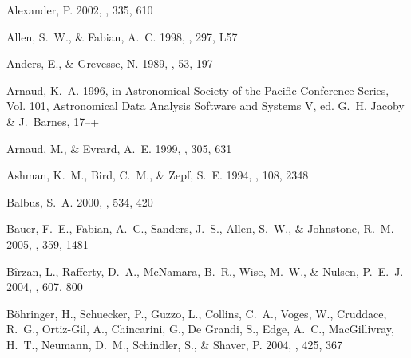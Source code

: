\documentclass[12pt,preprint]{aastex}
\begin{document}
\begin{thebibliography}{139}

{Alexander}, P. 2002, \mnras, 335, 610

{Allen}, S.~W., \& {Fabian}, A.~C. 1998, \mnras, 297, L57

{Anders}, E., \& {Grevesse}, N. 1989, \gca, 53, 197

{Arnaud}, K.~A. 1996, in Astronomical Society of the Pacific Conference Series,
  Vol. 101, Astronomical Data Analysis Software and Systems V, ed. G.~H.
  {Jacoby} \& J.~{Barnes}, 17--+

{Arnaud}, M., \& {Evrard}, A.~E. 1999, \mnras, 305, 631

{Ashman}, K.~M., {Bird}, C.~M., \& {Zepf}, S.~E. 1994, \aj, 108, 2348

{Balbus}, S.~A. 2000, \apj, 534, 420

{Bauer}, F.~E., {Fabian}, A.~C., {Sanders}, J.~S., {Allen}, S.~W., \&
  {Johnstone}, R.~M. 2005, \mnras, 359, 1481

{B{\^i}rzan}, L., {Rafferty}, D.~A., {McNamara}, B.~R., {Wise}, M.~W., \&
  {Nulsen}, P.~E.~J. 2004, \apj, 607, 800

{B{\"o}hringer}, H., {Schuecker}, P., {Guzzo}, L., {Collins}, C.~A., {Voges},
  W., {Cruddace}, R.~G., {Ortiz-Gil}, A., {Chincarini}, G., {De Grandi}, S.,
  {Edge}, A.~C., {MacGillivray}, H.~T., {Neumann}, D.~M., {Schindler}, S., \&
  {Shaver}, P. 2004, \aap, 425, 367


\end{thebibliography}
\end{document}
